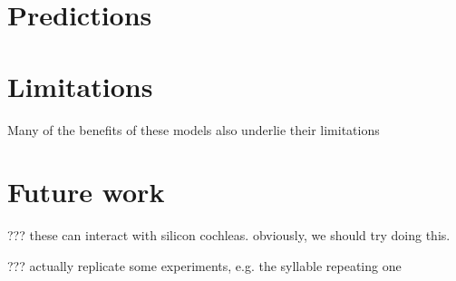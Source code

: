 \section{Predictions}




\section{Limitations}


Many of the benefits of these models
also underlie their limitations

\section{Future work}

??? these can interact with silicon cochleas.
obviously, we should try doing this.

??? actually replicate some experiments,
e.g. the syllable repeating one







